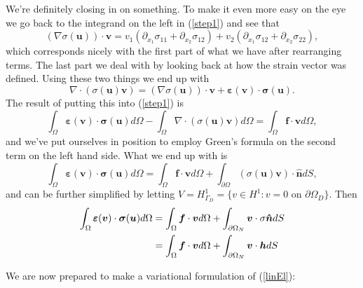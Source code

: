 \documentclass[paper=a4, fontsize=11pt]{scrartcl} %
\begin{document}
We're definitely closing in on something. To make it even more easy on the eye we go back to the integrand on the left in (\ref{step1}) and see that
\begin{equation*}
(\nabla \sigma(\boldsymbol{u}))\cdot \boldsymbol{v} = v_1(\partial_{x_1}\sigma_{11} + \partial_{x_2}\sigma_{12}) + v_2(\partial_{x_1}\sigma_{12} + \partial_{x_2}\sigma_{22}),
\end{equation*}
which corresponds nicely with the first part of what we have after rearranging terms. The last part we deal with by looking back at how the strain vector was defined. Using these two things we end up with
\begin{equation}
\label{step2}
\nabla \cdot (\sigma(\boldsymbol{u})\boldsymbol{v}) = (\nabla \sigma(\boldsymbol{u}))\cdot \boldsymbol{v} + \boldsymbol{\varepsilon}(\boldsymbol{v})\cdot \boldsymbol{\sigma}(\boldsymbol{u}).
\end{equation}
The result of putting this into (\ref{step1}) is
\begin{equation*}
\int_{\Omega}\boldsymbol{\varepsilon}(\boldsymbol{v})\cdot \boldsymbol{\sigma}(\boldsymbol{u})d\Omega - \int_{\Omega}\nabla \cdot (\sigma(\boldsymbol{u})\boldsymbol{v})d\Omega = \int_{\Omega}\boldsymbol{f}\cdot \boldsymbol{v} d\Omega,
\end{equation*}
and we've put ourselves in position to employ Green's formula on the second term on the left hand side. What we end up with is
\begin{equation*}
\int_{\Omega}\boldsymbol{\varepsilon}(\boldsymbol{v})\cdot \boldsymbol{\sigma}(\boldsymbol{u})d\Omega = \int_{\Omega}\boldsymbol{f}\cdot \boldsymbol{v} d\Omega + \int_{\partial \Omega}(\sigma(\boldsymbol{u})\boldsymbol{v})\cdot\boldsymbol{\hat{n}}dS,
\end{equation*}
and can be further simplified by letting $V = H^1_{\Gamma_D}=\{v \in H^1 : v=0$ on $\partial \Omega_D \}$. Then
\begin{align*}
\int_{\Omega}\boldsymbol{\varepsilon}(\boldsymbol{v})\cdot \boldsymbol{\sigma}(\boldsymbol{u})d\Omega &= \int_{\Omega}\boldsymbol{f}\cdot \boldsymbol{v} d\Omega + \int_{\partial \Omega_N}\boldsymbol{v}\cdot \sigma\boldsymbol{\hat{n}}dS  \notag \\
&= \int_{\Omega}\boldsymbol{f}\cdot \boldsymbol{v} d\Omega + \int_{\partial \Omega_N}\boldsymbol{v}\cdot\boldsymbol{h}dS
\end{align*}

We are now prepared to make a variational formulation of (\ref{linEl}): 
\end{document}
